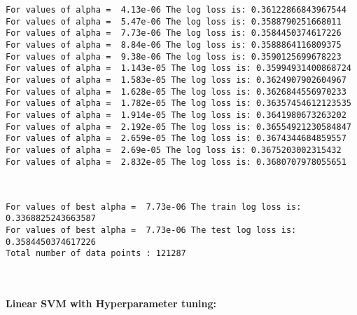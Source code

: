 \documentclass[11pt]{article}
\begin{document}
    \begin{Verbatim}[commandchars=\\\{\}]
For values of alpha =  4.13e-06 The log loss is: 0.36122866843967544
For values of alpha =  5.47e-06 The log loss is: 0.3588790251668011
For values of alpha =  7.73e-06 The log loss is: 0.3584450374617226
For values of alpha =  8.84e-06 The log loss is: 0.3588864116809375
For values of alpha =  9.38e-06 The log loss is: 0.3590125699678223
For values of alpha =  1.143e-05 The log loss is: 0.35994931400868724
For values of alpha =  1.583e-05 The log loss is: 0.3624907902604967
For values of alpha =  1.628e-05 The log loss is: 0.3626844556970233
For values of alpha =  1.782e-05 The log loss is: 0.36357454612123535
For values of alpha =  1.914e-05 The log loss is: 0.3641980673263202
For values of alpha =  2.192e-05 The log loss is: 0.36554921230584847
For values of alpha =  2.659e-05 The log loss is: 0.3674344684859557
For values of alpha =  2.69e-05 The log loss is: 0.3675203002315432
For values of alpha =  2.832e-05 The log loss is: 0.3680707978055651

    \end{Verbatim}

    \begin{center}
    \end{center}
    { \hspace*{\fill} \\}
    
    \begin{Verbatim}[commandchars=\\\{\}]
For values of best alpha =  7.73e-06 The train log loss is: 0.3368825243663587
For values of best alpha =  7.73e-06 The test log loss is: 0.3584450374617226
Total number of data points : 121287

    \end{Verbatim}

    \begin{center}
    \end{center}
    { \hspace*{\fill} \\}
    
    \paragraph{Linear SVM with Hyperparameter
tuning:}\label{linear-svm-with-hyperparameter-tuning}
\end{document}
